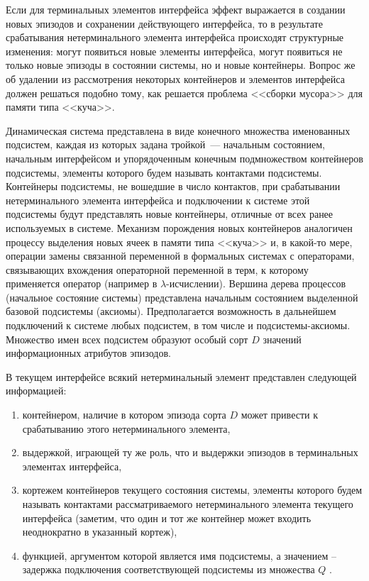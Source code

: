 Если для терминальных элементов интерфейса эффект выражается в создании новых эпизодов и сохранении действующего интерфейса, то в результате срабатывания нетерминального элемента интерфейса происходят структурные изменения: могут появиться новые элементы интерфейса, могут появиться не только новые эпизоды в состоянии системы, но и новые контейнеры. 
Вопрос же об удалении из рассмотрения некоторых контейнеров и элементов интерфейса должен решаться подобно тому, как решается проблема <<сборки мусора>> для памяти типа <<куча>>.

Динамическая система представлена в виде конечного множества именованных подсистем, каждая из которых задана тройкой~--- начальным состоянием, начальным интерфейсом и упорядоченным конечным подмножеством контейнеров подсистемы, элементы которого будем называть контактами подсистемы. 
Контейнеры подсистемы, не вошедшие в число контактов, при срабатывании нетерминального элемента интерфейса и подключении к системе этой подсистемы будут представлять новые контейнеры, отличные от всех ранее используемых в системе. 
Механизм порождения новых контейнеров аналогичен процессу выделения новых ячеек в памяти типа <<куча>> и, в какой-то мере, операции замены связанной переменной в формальных системах с операторами, связывающих вхождения операторной переменной в терм, к которому применяется оператор (например в $ \lambda $-исчислении). 
Вершина дерева процессов (начальное состояние системы) представлена начальным состоянием выделенной базовой подсистемы (аксиомы). 
Предполагается возможность в дальнейшем подключений к системе любых подсистем, в том числе и подсистемы-аксиомы. 
Множество имен всех подсистем образуют особый сорт $ D $ значений информационных атрибутов эпизодов.

В текущем интерфейсе всякий нетерминальный элемент представлен следующей информацией: 
\begin{enumerate}
	\item контейнером, наличие в котором эпизода сорта $ D $   может привести к срабатыванию этого нетерминального элемента, 
	\item  выдержкой, играющей ту же роль, что и выдержки эпизодов в терминальных элементах интерфейса, 
	\item  кортежем контейнеров текущего состояния системы, элементы которого будем называть контактами рассматриваемого нетерминального элемента текущего интерфейса (заметим, что один и тот же контейнер может входить неоднократно в указанный кортеж), 
	\item  функцией, аргументом которой является имя подсистемы, а значением – задержка подключения соответствующей подсистемы из множества $ Q $ .
\end{enumerate}  

